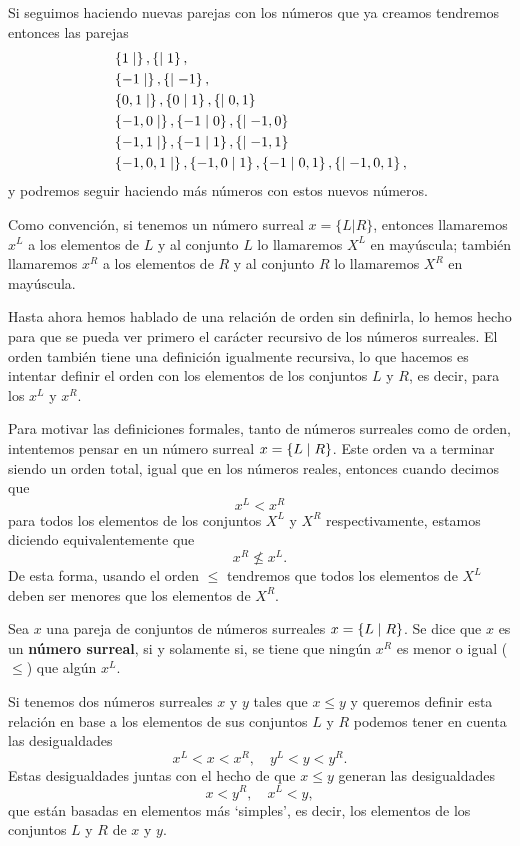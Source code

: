     Si seguimos haciendo nuevas parejas con los n\'umeros que ya creamos tendremos entonces las parejas
    \begin{align*}
        &\left\{1\mid \right\}, \left\{\mid 1\right\},\\
        &\left\{-1\mid \right\}, \left\{\mid -1\right\}, \\
        &\left\{0,1\mid \right\}, \left\{0\mid 1\right\}, \left\{\mid 0,1\right\} \\
        &\left\{-1,0\mid \right\}, \left\{-1\mid 0\right\}, \left\{\mid -1,0\right\} \\
        &\left\{-1,1\mid \right\}, \left\{-1\mid 1\right\}, \left\{\mid -1,1\right\} \\
        &\left\{-1,0,1\mid \right\}, \left\{-1,0\mid 1\right\}, \left\{-1\mid 0,1\right\}, \left\{\mid -1,0,1\right\},
    \end{align*}
    y podremos seguir haciendo m\'as n\'umeros con estos nuevos n\'umeros.
    
    Como convención, si tenemos un número surreal $x=\{L|R\}$, entonces llamaremos $x^L$ a los elementos de $L$ y al conjunto $L$ lo llamaremos $X^L$ en may\'uscula; tambi\'en llamaremos $x^R$ a los elementos de $R$ y al conjunto $R$ lo llamaremos $X^R$ en may\'uscula.

    Hasta ahora hemos hablado de una relaci\'on de orden sin definirla, lo hemos hecho para que se pueda ver primero el car\'acter recursivo de los n\'umeros surreales. El orden tambi\'en tiene una definici\'on igualmente recursiva, lo que hacemos es intentar definir el orden con los elementos de los conjuntos $L$ y $R$, es decir, para los $x^L$ y $x^R$.

    Para motivar las definiciones formales, tanto de n\'umeros surreales como de orden, intentemos pensar en un n\'umero surreal $x = \left\{L\mid R\right\}$. Este orden va a terminar siendo un orden total, igual que en los n\'umeros reales, entonces cuando decimos que
    \[
        x^L < x^R
    \]
    para todos los elementos de los conjuntos $X^L$ y $X^R$ respectivamente, estamos diciendo equivalentemente que
    \[
        x^R \not\le x^L.
    \]
    De esta forma, usando el orden $\le$ tendremos que todos los elementos de $X^L$ deben ser menores que los elementos de $X^R$.

    \begin{definition}
        Sea $x$ una pareja de conjuntos de n\'umeros surreales $x=\left\{L\mid R\right\}$. Se dice que $x$ es un \textbf{n\'umero surreal}, si y solamente si, se tiene que ningún $x^R$ es menor o igual ($\le$) que algún $x^L$. 
    \end{definition}

    Si tenemos dos n\'umeros surreales $x$ y $y$ tales que $x\le y$ y queremos definir esta relaci\'on en base a los elementos de sus conjuntos $L$ y $R$ podemos tener en cuenta las desigualdades
    \[
        x^L < x < x^R,\quad y^L < y < y^R.
    \]
    Estas desigualdades juntas con el hecho de que $x\le y$ generan las desigualdades
    \[
        x < y^R,\quad x^L < y,
    \]
    que est\'an basadas en elementos m\'as `simples', es decir, los elementos de los conjuntos $L$ y $R$ de $x$ y $y$.

